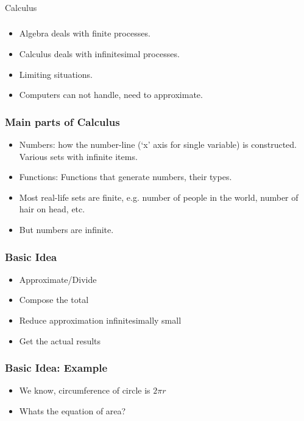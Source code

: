 \begin{frame}[fragile]\frametitle{}
\begin{center}
{\Large Calculus}
\end{center}
\end{frame}

 \begin{frame}[fragile]\frametitle{}
\begin{itemize}
\item Algebra deals with finite processes.
\item Calculus deals with infinitesimal processes.
\item Limiting situations.
\item Computers can not handle, need to approximate.
\end{itemize}
\end{frame}



 \begin{frame}[fragile]\frametitle{Main parts of Calculus}
\begin{itemize}
\item Numbers: how the number-line (`x' axis for single variable) is constructed. Various sets with infinite items.
\item Functions: Functions that generate numbers, their types.
\item Most real-life sets are finite, e.g. number of people in the world, number of hair on head, etc.
\item But numbers are infinite.
\end{itemize}
\end{frame}

 \begin{frame}[fragile]\frametitle{Basic Idea}
\begin{itemize}
\item Approximate/Divide
\item Compose the total
\item Reduce approximation infinitesimally small
\item Get the actual results
\end{itemize}
\end{frame}

 \begin{frame}[fragile]\frametitle{Basic Idea: Example}
\begin{itemize}
\item We know, circumference of circle is $2\pi r$
\item Whats the equation of area?
\end{itemize}
\end{frame}

